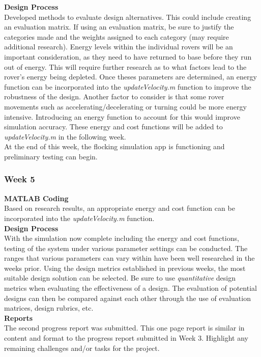 \documentclass[../CourseManual.tex]{subfiles}
\begin{document}
\textbf{Design Process}\\
Developed methods to evaluate design alternatives. This could include creating an evaluation matrix. If using an evaluation matrix, be sure to justify the categories made and the weights assigned to each category (may require additional research). Energy levels within the individual rovers will be an important consideration, as they need to have returned to base before they run out of energy. This will require further research as to what factors lead to the rover's energy being depleted. Once theses parameters are determined, an energy function can be incorporated into the \textit{updateVelocity.m} function to improve the robustness of the design. Another factor to consider is that some rover movements such as accelerating/decelerating or turning could be more energy intensive. Introducing an energy function to account for this would improve simulation accuracy. These energy and cost functions will be added to \textit{updateVelocity.m} in the following week.\\

At the end of this week, the flocking simulation app is functioning and preliminary testing can begin.


\subsubsection{Week 5} \label{Week 5: Flocking}
\textbf{MATLAB Coding}\\
Based on research results, an appropriate energy and cost function can be incorporated into the \textit{updateVelocity.m} function. \\

\textbf{Design Process}\\
With the simulation now complete including the energy and cost functions, testing of the system under various parameter settings can be conducted. The ranges that various parameters can vary within have been well researched in the weeks prior. Using the design metrics established in previous weeks, the most suitable design solution can be selected. Be sure to use \textit{quantitative} design metrics when evaluating the effectiveness of a design. The evaluation of potential designs can then be compared against each other through the use of evaluation matrices, design rubrics, etc. \\

\textbf{Reports}\\
The second progress report was submitted. This one page report is similar in content and format to the progress report submitted in Week 3. Highlight any remaining challenges and/or tasks for the project.\\
\end{document}
